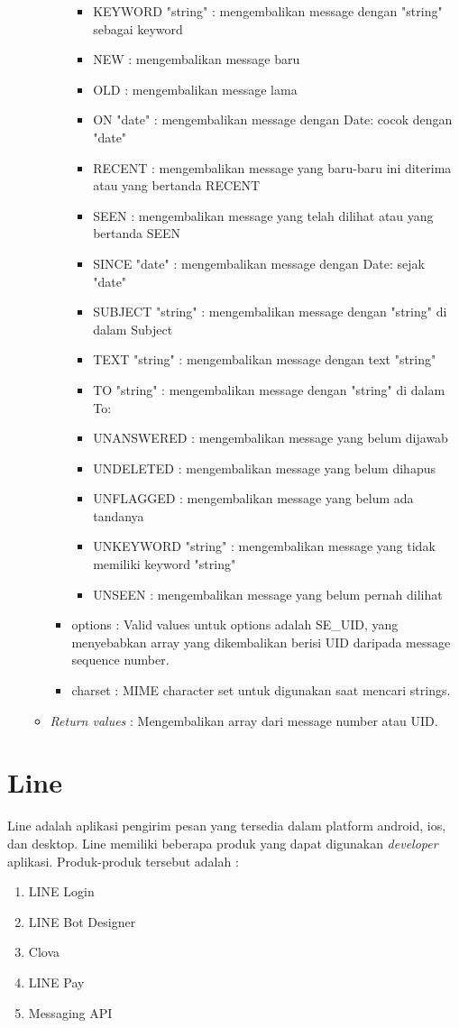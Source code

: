 \begin{itemize}
\begin{itemize}
\begin{itemize}
\begin{itemize}
  \item KEYWORD "string" : mengembalikan message dengan "string" sebagai keyword
  \item NEW : mengembalikan message baru
  \item OLD : mengembalikan message lama
  \item ON "date" : mengembalikan message dengan Date: cocok dengan "date"
  \item RECENT : mengembalikan message yang baru-baru ini diterima atau yang bertanda RECENT
  \item SEEN : mengembalikan message yang telah dilihat atau yang bertanda SEEN
  \item SINCE "date" : mengembalikan message dengan Date: sejak "date"
  \item SUBJECT "string" : mengembalikan message dengan "string" di dalam Subject
  \item TEXT "string" : mengembalikan message dengan text "string"
  \item TO "string" : mengembalikan message dengan "string" di dalam To:
  \item UNANSWERED : mengembalikan message yang belum dijawab
  \item UNDELETED : mengembalikan message yang belum dihapus
  \item UNFLAGGED : mengembalikan message yang belum ada tandanya
  \item UNKEYWORD "string" : mengembalikan message yang tidak memiliki keyword "string"
  \item UNSEEN : mengembalikan message yang belum pernah dilihat
  \end{itemize}
\item options : Valid values untuk options adalah SE\_UID, yang menyebabkan array yang dikembalikan berisi UID daripada message sequence number.
\item charset : MIME character set untuk digunakan saat mencari strings.
\end{itemize}
\item \textit{Return values} : Mengembalikan array dari message number atau UID.
\end{itemize}
 
\end{itemize}

\section{Line \cite{LINE-developer}}
\label{sec:Line}
Line adalah aplikasi pengirim pesan yang tersedia dalam platform android, ios, dan desktop. Line memiliki beberapa produk yang dapat digunakan \textit{developer} aplikasi. Produk-produk tersebut adalah :
\begin{enumerate}
\item LINE Login
\item LINE Bot Designer
\item Clova
\item LINE Pay
\item Messaging API
\end{enumerate}

